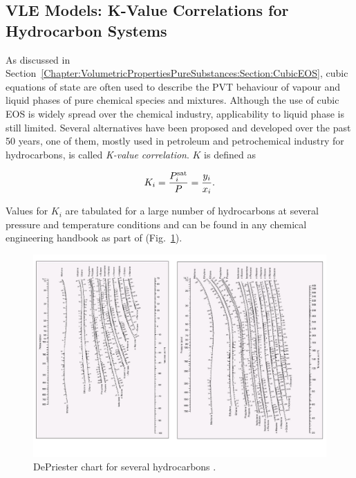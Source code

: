 \subsection{VLE Models: K-Value Correlations for Hydrocarbon Systems}\label{Chapter:VLE:Section:K_Values}
As discussed in Section~\ref{Chapter:VolumetricPropertiesPureSubstances:Section:CubicEOS}, cubic equations of state are often used to describe the PVT behaviour of vapour and liquid phases of pure chemical species and mixtures. Although the use of cubic EOS is widely spread over the chemical industry, applicability to liquid phase is still limited. Several alternatives have been proposed and developed over the past 50 years, one of them, mostly used in petroleum and petrochemical industry for hydrocarbons, is called {\it K-value correlation}. $K$ is defined as
\begin{shaded}
   \begin{equation}
      K_{i} = \displaystyle\frac{P_{i}^{\text{sat}}}{P} = \displaystyle\frac{y_{i}}{x_{i}}.\label{Chapter:VLE:Eqn:KValue}
   \end{equation}
\end{shaded}
Values for $K_{i}$ are tabulated for a large number of hydrocarbons at several pressure and temperature conditions and can be found in any chemical engineering handbook as part of  (Fig.~\ref{Chapter:VLE:Fig:Fig05}).
  \begin{figure}[h]
     \begin{center}
         \includegraphics[width=1.\linewidth,clip]{./Figs/DePriesterCharts}
     \end{center}
     \caption{DePriester chart for several hydrocarbons \citep[extracted from][]{SmithVanNess_Book}.}\label{Chapter:VLE:Fig:Fig05}
  \end{figure}
  
